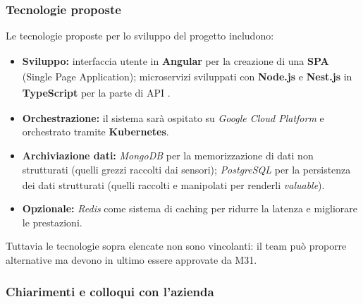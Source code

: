 \documentclass[a4paper,11pt]{article}
\begin{document}
\subsubsection{Tecnologie proposte}
Le tecnologie proposte per lo sviluppo del progetto\textsubscript{}
 includono:
\begin{itemize}[noitemsep, topsep=0pt]
 \item \textbf{Sviluppo:} 
 interfaccia\textsubscript{} utente in \textbf{Angular\textsubscript{}} per la creazione di una \textbf{SPA} (Single Page Application); 
 microservizi\textsubscript{} sviluppati con \textbf{Node.js} e \textbf{Nest.js} in \textbf{TypeScript} per la parte di API\textsubscript{}
.
 
 \item \textbf{Orchestrazione:} 
 il sistema sarà ospitato su \textit{Google Cloud Platform} e orchestrato tramite \textbf{Kubernetes}.
 
 \item \textbf{Archiviazione dati:} 
 \textit{MongoDB} per la memorizzazione di dati non strutturati (quelli grezzi raccolti dai sensori); 
 \textit{PostgreSQL\textsubscript{}} per la persistenza dei dati strutturati (quelli raccolti e manipolati per renderli \textit{valuable}).
 
 \item \textbf{Opzionale:} 
 \textit{Redis} come sistema di caching per ridurre la latenza e migliorare le prestazioni.
\end{itemize}
Tuttavia le tecnologie sopra elencate non sono vincolanti: il team può proporre alternative ma devono in ultimo essere approvate da M31.
\subsubsection{Chiarimenti e colloqui con l'azienda}
\end{document}
